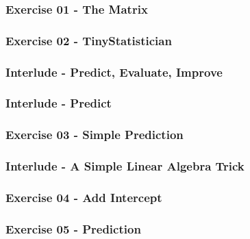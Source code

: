 \documentclass[]{article}
\begin{document}
\hypertarget{exercise-01---the-matrix}{%
\subsubsection{Exercise 01 - The
Matrix}\label{exercise-01---the-matrix}}

\hypertarget{exercise-02---tinystatistician}{%
\subsubsection{Exercise 02 -
TinyStatistician}\label{exercise-02---tinystatistician}}

\hypertarget{interlude---predict-evaluate-improve}{%
\subsubsection{Interlude - Predict, Evaluate,
Improve}\label{interlude---predict-evaluate-improve}}

\hypertarget{interlude---predict}{%
\subsubsection{Interlude - Predict}\label{interlude---predict}}

\hypertarget{exercise-03---simple-prediction}{%
\subsubsection{Exercise 03 - Simple
Prediction}\label{exercise-03---simple-prediction}}

\hypertarget{interlude---a-simple-linear-algebra-trick}{%
\subsubsection{Interlude - A Simple Linear Algebra
Trick}\label{interlude---a-simple-linear-algebra-trick}}

\hypertarget{exercise-04---add-intercept}{%
\subsubsection{Exercise 04 - Add
Intercept}\label{exercise-04---add-intercept}}

\hypertarget{exercise-05---prediction}{%
\subsubsection{Exercise 05 -
Prediction}\label{exercise-05---prediction}}
\end{document}
